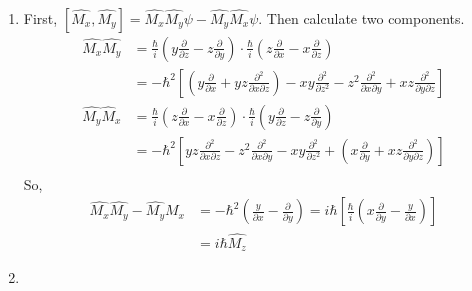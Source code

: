 \begin{solution}\
    \begin{enumerate}
        \item First, $[\hat{M_x},\hat{M_y}]=\hat{M_x}\hat{M_y}\psi-\hat{M_y}\hat{M_x}\psi$. Then calculate two components.
              \begin{align*}
                  \hat{M_x}\hat{M_y}   & =\frac{\hbar}{i}\left(y \frac{\partial}{\partial z}-z \frac{\partial}{\partial y}\right) \cdot
                  \frac{\hbar}{i}\left(z \frac{\partial}{\partial x}-x \frac{\partial}{\partial z}\right)                                                   \\
                                       & =-\hbar^{2}\left[\left(y \frac{\partial}{\partial x}+y z \frac{\partial^{2}}{\partial x \partial z}
                  \right)-x y \frac{\partial^{2}}{\partial z^{2}}-z^{2} \frac{\partial^{2}}{\partial x \partial y}+x z \frac{\partial^{2}}
                  {\partial y \partial z}\right]                                                                                                            \\
                  \hat{M_y}\hat{M}_{x} & =\frac{\hbar}{i}\left(z\frac{\partial}{\partial x}-x\frac{\partial}{\partial z}\right) \cdot \frac{\hbar}{i}
                  \left(y \frac{\partial}{\partial z}-z \frac{\partial}{\partial y}\right)                                                                  \\
                                       & =-\hbar^{2}\left[y z \frac{\partial^{2}}{\partial x \partial z}-z^{2}\frac{\partial^{2}}{\partial x \partial y}
                  -x y \frac{\partial^{2}}{\partial z^{2}}+\left(x \frac{\partial}{\partial y}+x z \frac{\partial^{2}}{\partial y \partial z}\right)\right] \\
              \end{align*}
              So,
              \begin{align*}
                  \hat{M_x}\hat{M_y}-\hat{M_y}\hat{M_x} & =-\hbar^{2}\left(\frac{y}{\partial x}-\frac{\partial}{\partial y}\right)=i \hbar\left[\frac{\hbar}{i}
                  \left(x \frac{\partial}{\partial y}-\frac{y}{\partial x}\right)\right]                                                                        \\
                                                        & =i\hbar\hat{M_z}
              \end{align*}
        \item \begin{align*}

\end{align*}
\end{enumerate}
\end{solution}
